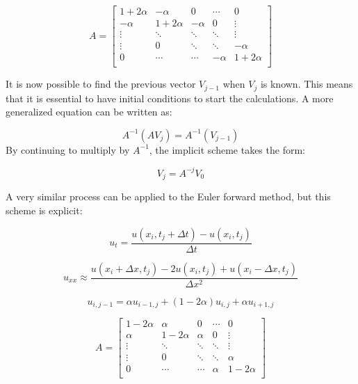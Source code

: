 \documentclass[10pt,a4paper]{article}
\begin{document}
\begin{equation}
A = \begin{bmatrix}
1 + 2\alpha & -\alpha & 0 & \cdots &0\\
-\alpha & 1 + 2\alpha & -\alpha & 0 & \vdots\\
\vdots & \ddots & \ddots & \ddots & \vdots\\
\vdots & 0 & \ddots & \ddots & -\alpha\\
0 & \cdots & \cdots & -\alpha & 1 + 2\alpha\\

\end{bmatrix}
\end{equation}

\noindent It is now possible to find the previous vector $V_{j-1}$ when $V_j$ is known. This means that it is essential to have initial conditions to start the calculations. A more generalized equation can be written as:

\begin{equation}
A^{-1}(AV_j) = A^{-1}(V_{j-1})
\end{equation}
\noindent By continuing to multiply by $A^{-1}$, the implicit scheme takes the form:

\begin{equation}
V_j = A^{-j}V_0
\end{equation}

\noindent A very similar process can be applied to the Euler forward method, but this scheme is explicit:

\begin{equation}
u_t = \frac{u(x_i,t_j + \Delta t) - u(x_i,t_j)}{\Delta t}
\end{equation}

\begin{equation}
u_{xx} \approx \frac{u(x_i + \Delta x,t_j) - 2u(x_i,t_j) + u(x_i - \Delta x,t_j)}{\Delta x^2} 
\end{equation}

\begin{equation}
u_{i,j-1} = \alpha u_{i-1,j} + (1 - 2\alpha)u_{i,j} + \alpha u_{i+1,j}
\end{equation}

\begin{equation}
A = \begin{bmatrix}
1 - 2\alpha & \alpha & 0 & \cdots & 0\\
\alpha & 1 - 2\alpha & \alpha & 0 & \vdots\\
\vdots & \ddots & \ddots & \ddots & \vdots\\
\vdots & 0 & \ddots & \ddots & \alpha\\
0 & \cdots & \cdots & \alpha & 1 - 2\alpha\\

\end{bmatrix}
\end{equation}
\end{document}
